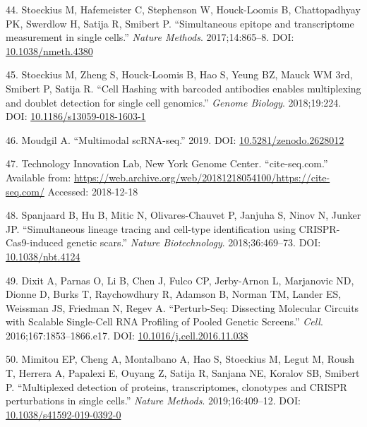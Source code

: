\documentclass[11pt,a4paper,titlepage,twoside,openright]{style/unimelbthesis}
\theoremstyle{definition}
\theoremstyle{definition}
\theoremstyle{definition}
\theoremstyle{remark}
\begin{document}
\begin{mainmatter}
\leavevmode\hypertarget{ref-Stoeckius2017-wm}{}%
44. Stoeckius M, Hafemeister C, Stephenson W, Houck-Loomis B, Chattopadhyay PK, Swerdlow H, Satija R, Smibert P. ``Simultaneous epitope and transcriptome measurement in single cells.'' \emph{Nature Methods}. 2017;14:865--8. DOI: \href{https://doi.org/10.1038/nmeth.4380}{10.1038/nmeth.4380}

\leavevmode\hypertarget{ref-Stoeckius2018-ij}{}%
45. Stoeckius M, Zheng S, Houck-Loomis B, Hao S, Yeung BZ, Mauck WM 3rd, Smibert P, Satija R. ``Cell Hashing with barcoded antibodies enables multiplexing and doublet detection for single cell genomics.'' \emph{Genome Biology}. 2018;19:224. DOI: \href{https://doi.org/10.1186/s13059-018-1603-1}{10.1186/s13059-018-1603-1}

\leavevmode\hypertarget{ref-Moudgil2019-bl}{}%
46. Moudgil A. ``Multimodal scRNA-seq.'' 2019. DOI: \href{https://doi.org/10.5281/zenodo.2628012}{10.5281/zenodo.2628012}

\leavevmode\hypertarget{ref-CITEseq_web}{}%
47. Technology Innovation Lab, New York Genome Center. ``cite-seq.com.'' Available from: \url{https://web.archive.org/web/20181218054100/https://cite-seq.com/} Accessed: 2018-12-18

\leavevmode\hypertarget{ref-Spanjaard2018-gn}{}%
48. Spanjaard B, Hu B, Mitic N, Olivares-Chauvet P, Janjuha S, Ninov N, Junker JP. ``Simultaneous lineage tracing and cell-type identification using CRISPR-Cas9-induced genetic scars.'' \emph{Nature Biotechnology}. 2018;36:469--73. DOI: \href{https://doi.org/10.1038/nbt.4124}{10.1038/nbt.4124}

\leavevmode\hypertarget{ref-Dixit2016-wp}{}%
49. Dixit A, Parnas O, Li B, Chen J, Fulco CP, Jerby-Arnon L, Marjanovic ND, Dionne D, Burks T, Raychowdhury R, Adamson B, Norman TM, Lander ES, Weissman JS, Friedman N, Regev A. ``Perturb-Seq: Dissecting Molecular Circuits with Scalable Single-Cell RNA Profiling of Pooled Genetic Screens.'' \emph{Cell}. 2016;167:1853--1866.e17. DOI: \href{https://doi.org/10.1016/j.cell.2016.11.038}{10.1016/j.cell.2016.11.038}

\leavevmode\hypertarget{ref-Mimitou2019-ju}{}%
50. Mimitou EP, Cheng A, Montalbano A, Hao S, Stoeckius M, Legut M, Roush T, Herrera A, Papalexi E, Ouyang Z, Satija R, Sanjana NE, Koralov SB, Smibert P. ``Multiplexed detection of proteins, transcriptomes, clonotypes and CRISPR perturbations in single cells.'' \emph{Nature Methods}. 2019;16:409--12. DOI: \href{https://doi.org/10.1038/s41592-019-0392-0}{10.1038/s41592-019-0392-0}


\end{mainmatter}
\end{document}
